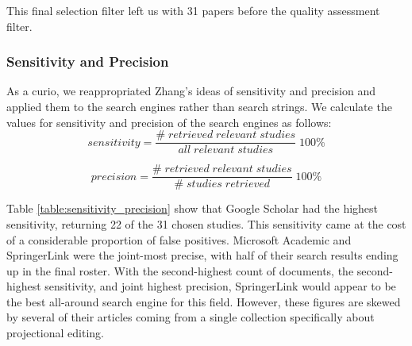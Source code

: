 This final selection filter left us with 31 papers before the quality assessment filter.

\subsubsection{Sensitivity and Precision}
As a curio, we reappropriated Zhang's\cite{Zhang_2011} ideas of sensitivity and precision and applied them to the search engines rather than search strings.
We calculate the values for sensitivity and precision of the search engines as follows:
\[
        sensitivity = \frac{\#\;retrieved\;relevant\;studies}{all\;relevant\;studies} \;100\%
\]

\[
        precision = \frac{\#\;retrieved\;relevant\;studies}{\#\;studies\;retrieved} \;100\%
\]

Table \ref{table:sensitivity_precision} show that Google Scholar had the highest sensitivity, returning 22 of the 31 chosen studies.
This sensitivity came at the cost of a considerable proportion of false positives.
Microsoft Academic and SpringerLink were the joint-most precise, with half of their search results ending up in the final roster.
With the second-highest count of documents, the second-highest sensitivity, and joint highest precision, SpringerLink would appear to be the best all-around search engine for this field.
However, these figures are skewed by several of their articles coming from a single collection specifically about projectional editing.

